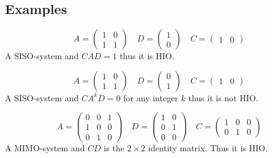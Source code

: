 \clearpage
\subsection{Examples}

\begin{example}{}{}
	\begin{equation}
	A = \begin{pmatrix}
	1 & 0 \\ 1 & 1
	\end{pmatrix}
	\quad
	D = \begin{pmatrix}
	1 \\ 0
	\end{pmatrix}
	\quad 
	C = \begin{pmatrix}
	1 & 0
	\end{pmatrix}
	\end{equation}
	A SISO-system and $CAD=1$ thus it is HIO.
\end{example}
\begin{example}{}{}
	\begin{equation}
	A = \begin{pmatrix}
	1 & 0 \\ 1 & 1
	\end{pmatrix}
	\quad
	D = \begin{pmatrix}
	0 \\ 1
	\end{pmatrix}
	\quad 
	C = \begin{pmatrix}
	1 & 0
	\end{pmatrix}
	\end{equation}
	A SISO-system and $CA^kD=0$ for any integer $k$ thus it is not HIO.
\end{example}
\begin{example}{}{}
	\begin{equation}
	A = \begin{pmatrix}
	0 & 0  & 1\\ 1 & 0 & 0 \\ 0 & 1 & 0
	\end{pmatrix}
	\quad
	D = \begin{pmatrix}
	1  & 0\\ 0 & 1 \\ 0 & 0
	\end{pmatrix}
	\quad 
	C = \begin{pmatrix}
	1 & 0 & 0 \\ 0 & 1 & 0
	\end{pmatrix}
	\end{equation}
	A MIMO-system and $CD$ is the $2\times 2$ identity matrix. Thus it is HIO.
\end{example}
